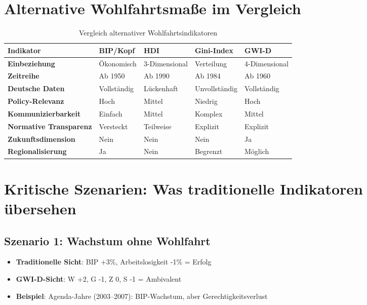 \section{Alternative Wohlfahrtsmaße im Vergleich}

\begin{table}[ht]
    \centering
    \caption{Vergleich alternativer Wohlfahrtsindikatoren}
    \label{tab:alternative_indikatoren}
    \begin{tabular}{lp{3cm}p{3cm}p{3cm}p{3cm}}
        \toprule
        \textbf{Indikator} & \textbf{BIP/Kopf} & \textbf{HDI} & \textbf{Gini-Index} & \textbf{GWI-D} \\
        \midrule
        \textbf{Einbeziehung} & Ökonomisch & 3-Dimensional & Verteilung & 4-Dimensional \\
        \textbf{Zeitreihe} & Ab 1950 & Ab 1990 & Ab 1984 & Ab 1960 \\
        \textbf{Deutsche Daten} & Vollständig & Lückenhaft & Unvollständig & Vollständig \\
        \textbf{Policy-Relevanz} & Hoch & Mittel & Niedrig & Hoch \\
        \textbf{Kommunizierbarkeit} & Einfach & Mittel & Komplex & Mittel \\
        \textbf{Normative Transparenz} & Versteckt & Teilweise & Explizit & Explizit \\
        \textbf{Zukunftsdimension} & Nein & Nein & Nein & Ja \\
        \textbf{Regionalisierung} & Ja & Nein & Begrenzt & Möglich \\
        \bottomrule
    \end{tabular}
\end{table}

\section{Kritische Szenarien: Was traditionelle Indikatoren übersehen}

\subsection{Szenario 1: Wachstum ohne Wohlfahrt}

\begin{itemize}
    \item \textbf{Traditionelle Sicht}: BIP +3\%, Arbeitslosigkeit -1\% = Erfolg
    \item \textbf{GWI-D-Sicht}: W +2, G -1, Z 0, S -1 = Ambivalent
    \item \textbf{Beispiel}: Agenda-Jahre (2003–2007): BIP-Wachstum, aber Gerechtigkeitsverlust
\end{itemize}

